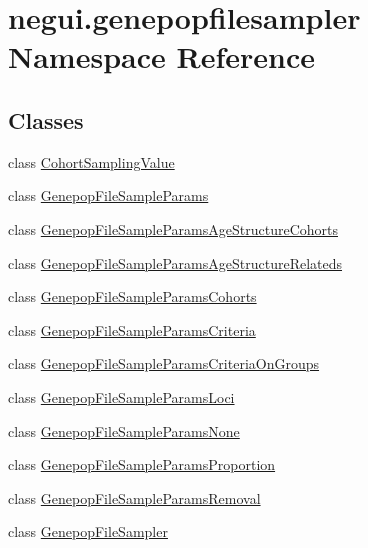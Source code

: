 \hypertarget{namespacenegui_1_1genepopfilesampler}{}\section{negui.\+genepopfilesampler Namespace Reference}
\label{namespacenegui_1_1genepopfilesampler}
\subsection*{Classes}
\begin{DoxyCompactItemize}
\item 
class \hyperlink{classnegui_1_1genepopfilesampler_1_1CohortSamplingValue}{Cohort\+Sampling\+Value}
\item 
class \hyperlink{classnegui_1_1genepopfilesampler_1_1GenepopFileSampleParams}{Genepop\+File\+Sample\+Params}
\item 
class \hyperlink{classnegui_1_1genepopfilesampler_1_1GenepopFileSampleParamsAgeStructureCohorts}{Genepop\+File\+Sample\+Params\+Age\+Structure\+Cohorts}
\item 
class \hyperlink{classnegui_1_1genepopfilesampler_1_1GenepopFileSampleParamsAgeStructureRelateds}{Genepop\+File\+Sample\+Params\+Age\+Structure\+Relateds}
\item 
class \hyperlink{classnegui_1_1genepopfilesampler_1_1GenepopFileSampleParamsCohorts}{Genepop\+File\+Sample\+Params\+Cohorts}
\item 
class \hyperlink{classnegui_1_1genepopfilesampler_1_1GenepopFileSampleParamsCriteria}{Genepop\+File\+Sample\+Params\+Criteria}
\item 
class \hyperlink{classnegui_1_1genepopfilesampler_1_1GenepopFileSampleParamsCriteriaOnGroups}{Genepop\+File\+Sample\+Params\+Criteria\+On\+Groups}
\item 
class \hyperlink{classnegui_1_1genepopfilesampler_1_1GenepopFileSampleParamsLoci}{Genepop\+File\+Sample\+Params\+Loci}
\item 
class \hyperlink{classnegui_1_1genepopfilesampler_1_1GenepopFileSampleParamsNone}{Genepop\+File\+Sample\+Params\+None}
\item 
class \hyperlink{classnegui_1_1genepopfilesampler_1_1GenepopFileSampleParamsProportion}{Genepop\+File\+Sample\+Params\+Proportion}
\item 
class \hyperlink{classnegui_1_1genepopfilesampler_1_1GenepopFileSampleParamsRemoval}{Genepop\+File\+Sample\+Params\+Removal}
\item 
class \hyperlink{classnegui_1_1genepopfilesampler_1_1GenepopFileSampler}{Genepop\+File\+Sampler}

\end{DoxyCompactItemize}
